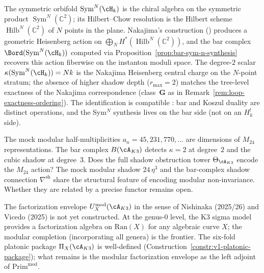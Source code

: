 \begin{remark}
\label{rem:sym-n-nakajima}
The symmetric orbifold $\operatorname{Sym}^N(\cH_k)$ is the
chiral algebra on the symmetric product
$\operatorname{Sym}^N(\mathbb{C}^2)$; its Hilbert--Chow
resolution is the Hilbert scheme
$\operatorname{Hilb}^N(\mathbb{C}^2)$ of $N$ points in the
plane. Nakajima's construction
(\cite{Nakajima1997,Nakajima1999}) produces a geometric
Heisenberg action on
$\bigoplus_N H^*(\operatorname{Hilb}^N(\mathbb{C}^2))$, and
the bar complex
$\Bord(\operatorname{Sym}^N(\cH_k))$ computed via
Proposition~\ref{prop:bar-sym-n-synthesis} recovers this
action fiberwise on the instanton moduli space. The
degree-$2$ scalar
$\kappa(\operatorname{Sym}^N(\cH_k)) = Nk$ is the Nakajima Heisenberg
central charge on the $N$-point stratum; the absence of
higher shadow depth ($r_{\max} = 2$) matches the
tree-level exactness of the Nakajima correspondence
(class~$\mathbf{G}$ as in
Remark~\ref{rem:loop-exactness-ordering}). The
identification is compatible : bar and Koszul
duality are distinct operations, and the Sym$^N$ synthesis
lives on the bar side (not on an $H_k^!$ side).
\end{remark}

\begin{openproblem}
\label{op:bar-m24}
The mock modular half-multiplicities $a_n = 45, 231, 770,\ldots$
are dimensions of $M_{24}$ representations. The bar complex
$B(\cA_{K3})$ detects $\kappa = 2$ at degree~$2$ and the cubic
shadow at degree~$3$. Does the full shadow obstruction tower
$\Theta_{\cA_{K3}}$ encode the $M_{24}$ action? The mock modular
shadow $24\,\eta^3$ and the bar-complex shadow connection
$\nabla^{\mathrm{sh}}$ share the structural feature of encoding
modular non-invariance. Whether they are related by a precise
functor remains open.
\end{openproblem}

\begin{openproblem}
\label{op:fact-envelope-k3}
The factorization envelope $U^{\mathrm{mod}}_X(\cA_{K3})$ in the
sense of Nishinaka (2025/26) and Vicedo (2025) is not yet
constructed. At the genus-$0$ level, the K3 sigma model provides a
factorization algebra on $\mathrm{Ran}(X)$ for any algebraic curve
$X$; the modular completion (incorporating all genera) is the
frontier. The six-fold platonic package
$\Pi_X(\cA_{K3})$ is well-defined
(Construction~\ref{constr:v1-platonic-package}); what remains is the
modular factorization envelope as the left adjoint of $\mathrm{Prim}^{\mathrm{mod}}$.
\end{openproblem}

